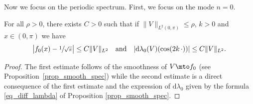 Now we focus on the periodic spectrum. First, we focus on the mode $n=0$.
\begin{lemma}
\label{lem_mode0}
For all $\rho>0$, there exists $C>0$ such that if $\|V\|_{L^2(0,\pi)}\leq \rho$, $k>0$ and $x\in (0,\pi)$ we have
\[
\big|f_0(x) - \sfrac1{\sqrt\pi}\big|\leq C \| V\|_{L^2} \quad \text{and} \quad |\mathrm{d}\lambda_0(V)(\cos(2k \, \cdot ))| \leq C \| V\|_{L^2}.
\]
\end{lemma}
\begin{proof} The first estimate follows of the smoothness of $V \mto f_0$ (see Proposition~\ref{prop_smooth_spec}) while the second estimate is a direct consequence of the first estimate and the expression of $\mathrm{d}\lambda_0$ given by the formula \eqref{eq_diff_lambda} of Proposition \ref{prop_smooth_spec}.
\end{proof}

